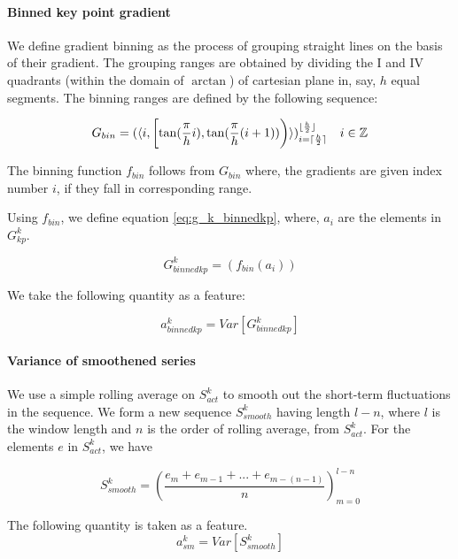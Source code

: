 \documentclass[
10pt,           %
a4paper,        %
oneside,        %
headinclude,footinclude, %
]{scrartcl}
\begin{document}
\paragraph{Binned key point gradient}
We define gradient binning as the process of grouping straight lines on the basis of their gradient. The grouping ranges are obtained by dividing the I and IV quadrants (within the domain of $\arctan$) of cartesian plane in, say, $h$ equal segments. The binning ranges are defined by the following sequence:

\begin{equation} \label{eq:gbin}
G_{bin} = (\langle i, \intco{\tan(\frac{\pi}{h}i), \tan(\frac{\pi}{h}(i+1))} \rangle)_{i=\lceil\frac{h}{2}\rceil}^{\lfloor\frac{h}{2}\rfloor} \quad i \in \mathbb{Z}
\end{equation}


The binning function $f_{bin}$ follows from $G_{bin}$ where, the gradients are given index number $i$, if they fall in corresponding range.

Using $f_{bin}$, we define equation \ref{eq:g_k_binnedkp}, where, $a_i$ are the elements in $G^k_{kp}$.

\begin{equation} \label{eq:g_k_binnedkp}
G^k_{binned kp} = (f_{bin}(a_i))
\end{equation}


We take the following quantity as a feature:

\begin{equation} \label{eq:a_bin_kp}
a_{binnedkp}^k = Var[G^k_{binned kp}]
\end{equation}


\paragraph{Variance of smoothened series}
We use a simple rolling average on $S^k_{act}$ to smooth out the short-term fluctuations in the sequence. We form a new sequence $S^k_{smooth}$ having length $l-n$, where $l$ is the window length and $n$ is the order of rolling average, from $S^k_{act}$. For the elements $e$ in $S^k_{act}$, we have

\begin{equation} \label{eq:sk_smooth}
S^k_{smooth} = (\frac{e_{m}+e_{m-1}+...+e_{m-(n-1)}}{n})_{m=0}^{l-n}
\end{equation}

The following quantity is taken as a feature.
\begin{equation} \label{eq:sk_smooth}
a_{sm}^k = Var[S^k_{smooth}]
\end{equation}
\end{document}
